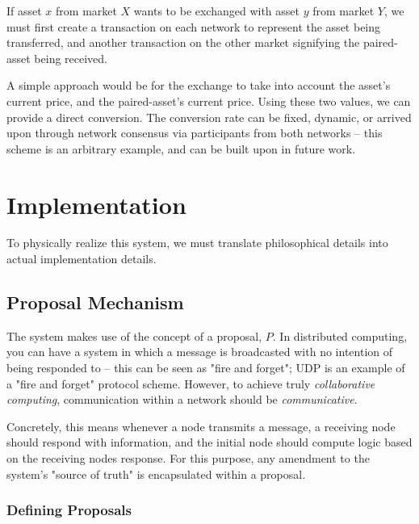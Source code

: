 \documentclass[10pt, titlepage, twocolumn]{report}
\begin{document}
\hspace*{15pt}
If asset \(x\) from market \(X\) wants to be exchanged with asset \(y\) from market \(Y\), we must first create a transaction on each network to represent the asset being transferred, and another transaction on the other market signifying the paired-asset being received.

\hspace*{15pt}
A simple approach would be for the exchange to take into account the asset's current price, and the paired-asset's current price. Using these two values, we can provide a direct conversion. The conversion rate can be fixed, dynamic, or arrived upon through network consensus via participants from both networks -- this scheme is an arbitrary example, and can be built upon in future work.



\section{Implementation}
\hspace*{15pt}
To physically realize this system, we must translate philosophical details into actual implementation details. 

\subsection{Proposal Mechanism}
\hspace*{15pt}
The system makes use of the concept of a proposal, \(P\). In distributed computing, you can have a system in which a message is broadcasted with no intention of being responded to -- this can be seen as "fire and forget"; UDP is an example of a "fire and forget" protocol scheme. However, to achieve truly \textit{collaborative computing}, communication within a network should be \textit{communicative}. 

\hspace*{15pt}
Concretely, this means whenever a node transmits a message, a receiving node should respond with information, and the initial node should compute logic based on the receiving nodes response. For this purpose, any amendment to the system's "source of truth" is encapsulated within a proposal. 

\subsubsection{Defining Proposals}
\end{document}
